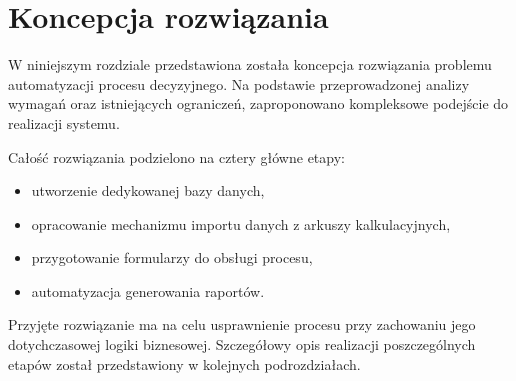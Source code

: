 \section{Koncepcja rozwiązania}

W niniejszym rozdziale przedstawiona została koncepcja rozwiązania problemu automatyzacji procesu decyzyjnego. Na podstawie przeprowadzonej analizy wymagań oraz istniejących ograniczeń, zaproponowano kompleksowe podejście do realizacji systemu.

Całość rozwiązania podzielono na cztery główne etapy:
\begin{itemize}
    \item utworzenie dedykowanej bazy danych,
    \item opracowanie mechanizmu importu danych z arkuszy kalkulacyjnych,
    \item przygotowanie formularzy do obsługi procesu,
    \item automatyzacja generowania raportów.
\end{itemize}

Przyjęte rozwiązanie ma na celu usprawnienie procesu przy zachowaniu jego dotychczasowej logiki biznesowej. Szczegółowy opis realizacji poszczególnych etapów został przedstawiony w kolejnych podrozdziałach.